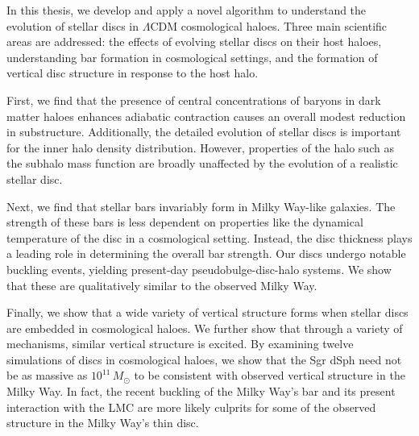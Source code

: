 In this thesis, we develop and apply a novel algorithm to understand 
the evolution of stellar discs in $\Lambda$CDM cosmological haloes.
Three main scientific areas are addressed: the effects of evolving stellar
discs on their host haloes, understanding bar formation in cosmological settings,
and the formation of vertical disc structure in response to the host halo.

First, we find that the presence of central concentrations of baryons in dark 
matter haloes enhances adiabatic contraction causes an overall modest 
reduction in substructure. Additionally, the detailed evolution of stellar discs 
is important for the inner halo density distribution. However,
properties of the halo such as the subhalo mass function are broadly unaffected
by the evolution of a realistic stellar disc.


Next, we find that stellar bars invariably form in Milky Way-like galaxies. The 
strength of these bars is less dependent on properties like the dynamical
temperature of the disc in a cosmological setting. Instead, the disc thickness
plays a leading role in determining the overall bar strength. Our discs
undergo notable buckling events, yielding present-day pseudobulge-disc-halo
systems. We show that these are qualitatively similar to the observed Milky Way.

Finally, we show that a wide variety of vertical structure forms when 
stellar discs are embedded in cosmological haloes. We further show that through
a variety of mechanisms, similar vertical structure is excited. By examining
twelve simulations of discs in cosmological haloes, we show that the Sgr dSph
need not be as massive as $10^{11}\,M_\odot$ to be consistent with observed
vertical structure in the Milky Way. In fact, the recent buckling of the Milky Way's
bar and its present interaction with the LMC are more likely culprits for some of
the observed structure in the Milky Way's thin disc.